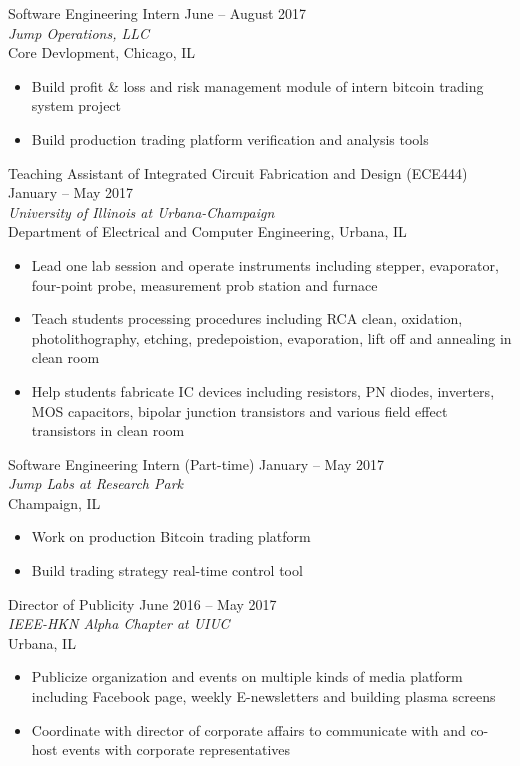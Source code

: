 \documentclass[10pt]{res} %
\begin{document}
\begin{resume}
Software Engineering Intern \hfill June -- August 2017 \\
{\sl Jump Operations, LLC} \\ 
Core Devlopment, Chicago, IL 
\begin{itemize} \itemsep -2pt %
    \item Build profit \& loss and risk management module of intern bitcoin trading system project 
    \item Build production trading platform verification and analysis tools 
\end{itemize}


Teaching Assistant of Integrated Circuit Fabrication and Design (ECE444) \hfill January -- May 2017 \\
{\sl University of Illinois at Urbana-Champaign} \\ 
Department of Electrical and Computer Engineering, Urbana, IL 
\begin{itemize} \itemsep -2pt %
    \item Lead one lab session and operate instruments including stepper, evaporator, four-point probe, measurement prob station and furnace
    \item Teach students processing procedures including RCA clean, oxidation, photolithography, etching, predepoistion, evaporation, lift off and annealing in clean room
    \item Help students fabricate IC devices including resistors, PN diodes, inverters, MOS capacitors, bipolar junction transistors and various field effect transistors in clean room
\end{itemize}


Software Engineering Intern (Part-time) \hfill January -- May 2017 \\
{\sl Jump Labs at Research Park} \\ 
Champaign, IL 
\begin{itemize} \itemsep -2pt %
    \item Work on production Bitcoin trading platform 
    \item Build trading strategy real-time control tool
\end{itemize}


Director of Publicity \hfill June 2016 -- May 2017 \\
{\sl IEEE-HKN Alpha Chapter at UIUC} \\ 
Urbana, IL 
\begin{itemize} \itemsep -2pt %
    \item Publicize organization and events on multiple kinds of media platform including Facebook page, weekly E-newsletters and building plasma screens 
    \item Coordinate with director of corporate affairs to communicate with and co-host events with corporate representatives
\end{itemize}



\end{resume}
\end{document}
